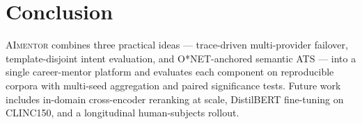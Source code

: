 \documentclass[conference]{IEEEtran}
\begin{document}
\section{Conclusion}\label{sec:conclusion}

\textsc{AImentor} combines three practical ideas --- trace-driven
multi-provider failover, template-disjoint intent evaluation, and
O*NET-anchored semantic ATS --- into a single career-mentor platform
and evaluates each component on reproducible corpora with
multi-seed aggregation and paired significance tests. Future work
includes in-domain cross-encoder reranking at scale, DistilBERT
fine-tuning on CLINC150, and a longitudinal human-subjects rollout.



\end{document}
